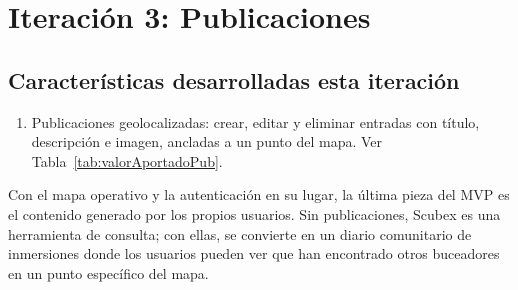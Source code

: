 \chapter{Iteración 3: Publicaciones}

\begin{abstract}
Esta iteración añade el final del MVP de Scubex: Un sistema de publicaciones. Los usuarios autenticados pueden crear publicaciones geolocalizadas con imagen desde cualquier punto del mapa, y cualquier visitante puede consultarlas directamente desde los marcadores del mapa.\end{abstract}

\section{Características desarrolladas esta iteración}

\begin{enumerate}
\item Publicaciones geolocalizadas: crear, editar y eliminar entradas con título, descripción e imagen, ancladas a un punto del mapa. Ver Tabla~\ref{tab:valorAportadoPub}.
\end{enumerate}

Con el mapa operativo y la autenticación en su lugar, la última pieza del MVP es el contenido generado por los propios usuarios. Sin publicaciones, Scubex es una herramienta de consulta; con ellas, se convierte en un diario comunitario de inmersiones donde los usuarios pueden ver que han encontrado otros buceadores en un punto específico del mapa.

